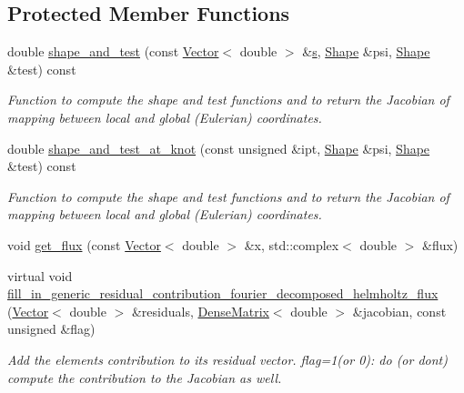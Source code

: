 \subsection*{Protected Member Functions}
\begin{DoxyCompactItemize}
\item 
double \hyperlink{classoomph_1_1FourierDecomposedHelmholtzFluxElement_ac991bbf6a39e26792e123505779faa9c}{shape\+\_\+and\+\_\+test} (const \hyperlink{classoomph_1_1Vector}{Vector}$<$ double $>$ \&\hyperlink{cfortran_8h_ab7123126e4885ef647dd9c6e3807a21c}{s}, \hyperlink{classoomph_1_1Shape}{Shape} \&psi, \hyperlink{classoomph_1_1Shape}{Shape} \&test) const
\begin{DoxyCompactList}\small\item\em Function to compute the shape and test functions and to return the Jacobian of mapping between local and global (Eulerian) coordinates. \end{DoxyCompactList}\item 
double \hyperlink{classoomph_1_1FourierDecomposedHelmholtzFluxElement_a5a16370bac4c75e810cf910957c2f978}{shape\+\_\+and\+\_\+test\+\_\+at\+\_\+knot} (const unsigned \&ipt, \hyperlink{classoomph_1_1Shape}{Shape} \&psi, \hyperlink{classoomph_1_1Shape}{Shape} \&test) const
\begin{DoxyCompactList}\small\item\em Function to compute the shape and test functions and to return the Jacobian of mapping between local and global (Eulerian) coordinates. \end{DoxyCompactList}\item 
void \hyperlink{classoomph_1_1FourierDecomposedHelmholtzFluxElement_a6a0c60d41a579713fc8ffad34e34cf75}{get\+\_\+flux} (const \hyperlink{classoomph_1_1Vector}{Vector}$<$ double $>$ \&x, std\+::complex$<$ double $>$ \&flux)
\item 
virtual void \hyperlink{classoomph_1_1FourierDecomposedHelmholtzFluxElement_ac1f295a6b98d41706b92f5af363d16a0}{fill\+\_\+in\+\_\+generic\+\_\+residual\+\_\+contribution\+\_\+fourier\+\_\+decomposed\+\_\+helmholtz\+\_\+flux} (\hyperlink{classoomph_1_1Vector}{Vector}$<$ double $>$ \&residuals, \hyperlink{classoomph_1_1DenseMatrix}{Dense\+Matrix}$<$ double $>$ \&jacobian, const unsigned \&flag)
\begin{DoxyCompactList}\small\item\em Add the element\textquotesingle{}s contribution to its residual vector. flag=1(or 0)\+: do (or don\textquotesingle{}t) compute the contribution to the Jacobian as well. \end{DoxyCompactList}\end{DoxyCompactItemize}
